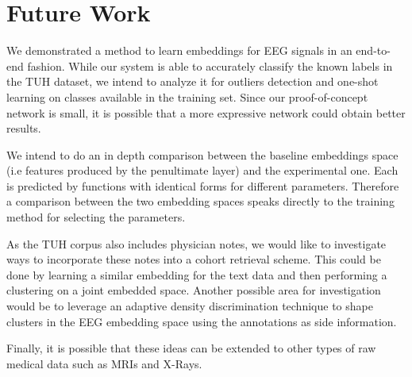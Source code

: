 \chapter{Future Work}

We demonstrated a method to learn embeddings for EEG signals in an end-to-end fashion. While our system is able to accurately classify the known labels in the TUH dataset, we intend to analyze it for outliers detection and one-shot learning on classes available in the training set. Since our proof-of-concept network is small, it is possible that a more expressive network could obtain better results.

We intend to do an in depth comparison between the baseline embeddings space (i.e features produced by the penultimate layer) and the experimental one. Each is predicted by functions with identical forms for different parameters. Therefore a comparison between the two embedding spaces speaks directly to the training method for selecting the parameters.

As the TUH corpus also includes physician notes, we would like to investigate ways to incorporate these notes into a cohort retrieval scheme. This could be done by learning a similar embedding for the text data and then performing a clustering on a joint embedded space. Another possible area for investigation would be to leverage an adaptive density discrimination technique \citet{magnetloss} to shape clusters in the EEG embedding space using the annotations as side information. 

Finally, it is possible that these ideas can be extended to other types of raw medical data such as MRIs and X-Rays.
